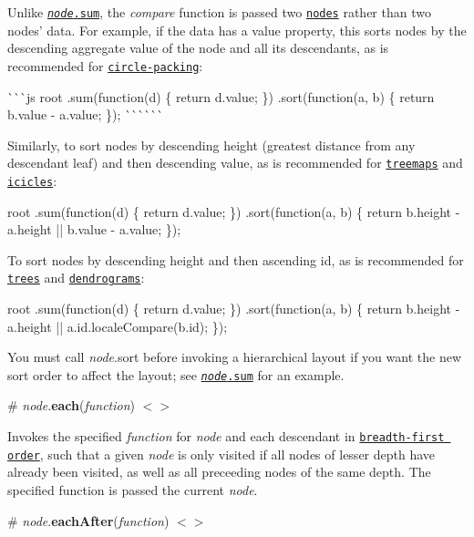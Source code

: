 Unlike \href{#node_sum}{\tt {\itshape node}.sum}, the {\itshape compare} function is passed two \href{#hierarchy}{\tt nodes} rather than two nodes’ data. For example, if the data has a value property, this sorts nodes by the descending aggregate value of the node and all its descendants, as is recommended for \href{#pack}{\tt circle-\/packing}\+:

\`{}\`{}\`{}js root .sum(function(d) \{ return d.\+value; \}) .sort(function(a, b) \{ return b.\+value -\/ a.\+value; \}); \`{}\`{}\`{}\`{}\`{}\`{}

Similarly, to sort nodes by descending height (greatest distance from any descendant leaf) and then descending value, as is recommended for \href{#treemap}{\tt treemaps} and \href{#partition}{\tt icicles}\+:


\begin{DoxyCode}
root
    .sum(function(d) \{ return d.value; \})
    .sort(function(a, b) \{ return b.height - a.height || b.value - a.value; \});
\end{DoxyCode}


To sort nodes by descending height and then ascending id, as is recommended for \href{#tree}{\tt trees} and \href{#cluster}{\tt dendrograms}\+:


\begin{DoxyCode}
root
    .sum(function(d) \{ return d.value; \})
    .sort(function(a, b) \{ return b.height - a.height || a.id.localeCompare(b.id); \});
\end{DoxyCode}


You must call {\itshape node}.sort before invoking a hierarchical layout if you want the new sort order to affect the layout; see \href{#node_sum}{\tt {\itshape node}.sum} for an example.

\label{_node_each}%
\# {\itshape node}.{\bfseries each}({\itshape function}) \href{https://github.com/d3/d3-hierarchy/blob/master/src/hierarchy/each.js}{\tt $<$$>$}

Invokes the specified {\itshape function} for {\itshape node} and each descendant in \href{https://en.wikipedia.org/wiki/Breadth-first_search}{\tt breadth-\/first order}, such that a given {\itshape node} is only visited if all nodes of lesser depth have already been visited, as well as all preceeding nodes of the same depth. The specified function is passed the current {\itshape node}.

\label{_node_eachAfter}%
\# {\itshape node}.{\bfseries each\+After}({\itshape function}) \href{https://github.com/d3/d3-hierarchy/blob/master/src/hierarchy/eachAfter.js}{\tt $<$$>$}

